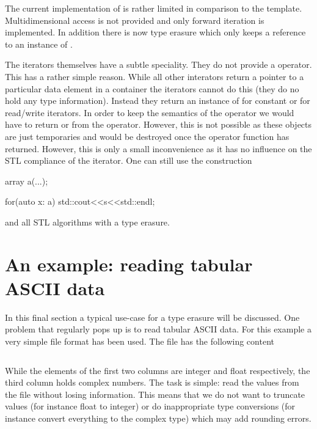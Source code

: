 The current implementation of  is rather limited in comparison 
to the  template. Multidimensional access is not provided and only
forward iteration is implemented. In addition there is now  
type erasure which only keeps a reference to an instance of . 

The iterators themselves have a subtle speciality. They do not provide a
\cpp{->} operator. This has a rather simple reason. While all other interators
return a pointer to a particular data element in a container the 
iterators cannot do this (they do no hold any type information). Instead they
return an instance of  for constant or  for
read/write iterators. In order to keep the semantics of the \cpp{->} operator we
would have to return  or  from the \cpp{->}
operator. However, this is not possible as these objects are just temporaries
and would be destroyed once the operator function has returned. 
However, this is only a small inconvenience as it has no influence on the 
STL compliance of the iterator. 
One can still use the  construction
\begin{cppcode}
array a(...);

for(auto x: a)
    std::cout<<s<<std::endl;
\end{cppcode}
and all STL algorithms with a  type erasure.


\section{An example: reading tabular ASCII data}

In this final section a typical use-case for a type erasure will be discussed. 
One problem that regularly pops up is to read tabular ASCII data. 
For this example a very simple file format has been used. The file
 has the following content
\inputminted[fontsize=\small,
             frame=lines,
             label=examples/record.dat]
{text}{../examples/record.dat}
While the elements of the first two columns are integer and float respectively,
the third column holds complex numbers. The task is simple: read the values from
the file without losing information. This means that we do not want to truncate
values (for instance float to integer) or do inappropriate type conversions (for
instance convert everything to the complex type) which may add rounding errors. 


